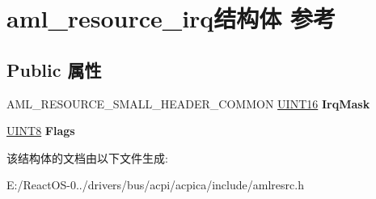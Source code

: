 \hypertarget{structaml__resource__irq}{}\section{aml\+\_\+resource\+\_\+irq结构体 参考}
\label{structaml__resource__irq}
\subsection*{Public 属性}
\begin{DoxyCompactItemize}
\item 
\mbox{\label{structaml__resource__irq_a0d02667a52e8d907bec2b330bfc6295a}} 
A\+M\+L\+\_\+\+R\+E\+S\+O\+U\+R\+C\+E\+\_\+\+S\+M\+A\+L\+L\+\_\+\+H\+E\+A\+D\+E\+R\+\_\+\+C\+O\+M\+M\+ON \hyperlink{_processor_bind_8h_a09f1a1fb2293e33483cc8d44aefb1eb1}{U\+I\+N\+T16} {\bfseries Irq\+Mask}
\item 
\mbox{\label{structaml__resource__irq_a3eb74680cd6c7e15ff327a2317d6648b}} 
\hyperlink{_processor_bind_8h_ab27e9918b538ce9d8ca692479b375b6a}{U\+I\+N\+T8} {\bfseries Flags}
\end{DoxyCompactItemize}


该结构体的文档由以下文件生成\+:\begin{DoxyCompactItemize}
\item 
E\+:/\+React\+O\+S-\/0../drivers/bus/acpi/acpica/include/amlresrc.\+h\end{DoxyCompactItemize}
